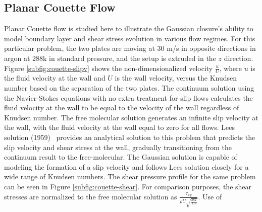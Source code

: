 \documentclass[titlepage,11pt,letterpaper]{article}
\begin{document}
\subsection{Planar Couette Flow}\label{sec:couette}
Planar Couette flow is studied here to illustrate the Gaussian closure's ability to model 
boundary layer and shear stress evolution in various flow regimes. For this particular 
problem, the two plates are moving at 30 m/s in opposite directions in argon at 288k in 
standard pressure, and the setup is extruded in the $z$ direction. Figure 
\ref{subfig:couette-slipv} shows the non-dimensionalized velocity $\frac{u}{U}$, where $u$ 
is the fluid velocity at the wall and $U$ is the wall velocity, versus the Knudsen number 
based on the separation of the two plates. The continuum solution using the Navier-Stokes 
equations with no extra treatment for slip flows calculates the fluid velocity at the wall 
to be equal to the velocity of the wall regardless of Knudsen number. The free molecular 
solution generates an infinite slip velocity at the wall, with the fluid velocity at the 
wall equal to zero for all flows. Lees solution (1959)~\cite{vincenti:1975} provides an 
analytical solution to this problem that predicts the slip velocity and shear stress at 
the wall, gradually transitioning from the continuum result to the free-molecular. The 
Gaussian solution is capable of modeling the formation of a slip velocity and follows Lees 
solution closely for a wide range of Knudsen numbers.
%
%
The shear pressure profile for the same problem can be seen in Figure 
\ref{subfig:couette-shear}. For comparison purposes, the shear stresses are normalized to 
the free molecular solution as $\frac{\tau_{xy}}{\rho U \sqrt{\frac{2kT}{\pi m}}}$. Use of 
\end{document}
